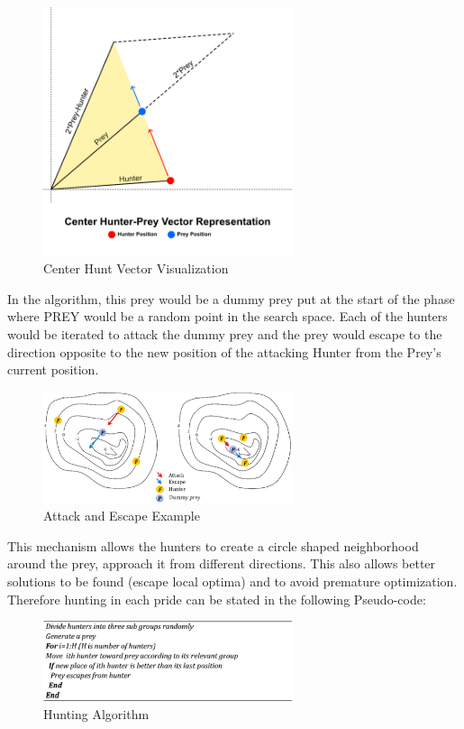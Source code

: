 \begin{figure}[h]
\begin{center}
\includegraphics[width=0.65\textwidth]{img/pa/center-hunt}
\caption{Center Hunt Vector Visualization}
\end{center}
\end{figure}

\par In the algorithm, this prey would be a dummy prey put at the start of the phase where PREY would be a random point in the search space. Each of the hunters would be iterated to attack the dummy prey and the prey would escape to the direction opposite to the new position of the attacking Hunter from the Prey's current position.
\begin{figure}[h]
\begin{center}
\includegraphics[width=0.65\textwidth]{img/pa/hunting_attack}
\caption{Attack and Escape Example}
\end{center}
\end{figure}
\par This mechanism allows the hunters to create a circle shaped neighborhood around the prey, approach it from different directions. This also allows better solutions to be found (escape local optima) and to avoid premature optimization.
Therefore hunting in each pride can be stated in the following Pseudo-code:
\begin{figure}[h]
\begin{center}
\includegraphics[width=0.65\textwidth]{img/pa/hunting_pseudo}
\caption{Hunting Algorithm}
\end{center}
\end{figure}

